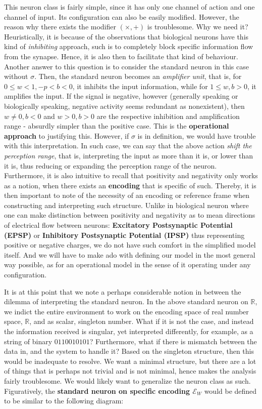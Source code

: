 This neuron class is fairly simple, since it has only one channel of action and one channel of input. Its configuration can also be easily modified. However, the reason why there exists the modifier $(\times, +)$ is troublesome. Why we need it? Heuristically, it is because of the observations that biological neurons have this kind of \textit{inhibiting} approach, such is to completely block specific information flow from the synapse. Hence, it is also then to facilitate that kind of behaviour. Another answer to this question is to consider the standard neuron in this case without $\sigma$. Then, the standard neuron becomes an \textit{amplifier unit}, that is, for $0\leq w<1,-p<b<0$, it inhibits the input information, while for $1\leq w,b>0$, it amplifies the input. If the signal is negative, however (generally speaking or biologically speaking, negative activity seems redundant as nonexistent), then $w\neq 0,b<0$ and $w>0,b>0$ are the respective inhibition and amplification range - absurdly simpler than the positive case. This is the \textbf{operational approach} to justifying this. However, if $\sigma$ is in definition, we would have trouble with this interpretation. In such case, we can say that the above action \textit{shift the perception range}, that is, interpreting the input as more than it is, or lower than it is, thus reducing or expanding the perception range of the neuron. Furthermore, it is also intuitive to recall that positivity and negativity only works as a notion, when there exists an \textbf{encoding} that is specific of such. Thereby, it is then important to note of the necessity of an encoding or reference frame when constructing and interpreting such structure. Unlike in biological neuron where one can make distinction between positivity and negativity as to mean directions of electrical flow between neurons: \textbf{Excitatory Postsynaptic Potential (EPSP)} or \textbf{Inhibitory Postsynaptic Potential (IPSP)} thus representing positive or negative charges, we do not have such comfort in the simplified model itself. And we will have to make ado with defining our model in the most general way possible, as for an operational model in the sense of it operating under any configuration. 

It is at this point that we note a perhaps considerable notion in between the dilemma of interpreting the standard neuron. In the above standard neuron on $\mathbb{R}$, we indict the entire environment to work on the encoding space of real number space, $\mathbb{R}$, and as scalar, singleton number. What if it is not the case, and instead the information received is singular, yet interpreted differently, for example, as a string of binary $0110010101$? Furthermore, what if there is mismatch between the data in, and the system to handle it? Based on the singleton structure, then this would be inadequate to resolve. We want a minimal structure, but there are a lot of things that is perhaps not trivial and is not minimal, hence makes the analysis fairly troublesome. We would likely want to generalize the neuron class as such. Figuratively, the \textbf{standard neuron on specific encoding $\mathcal{E}_{W}$} would be defined to be similar to the following diagram:

